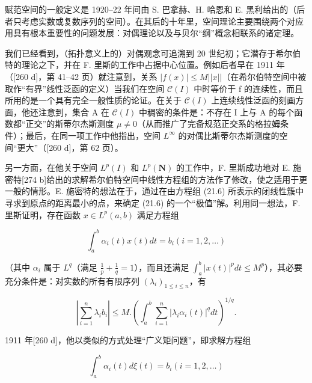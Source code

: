 赋范空间的一般定义是 1920–22 年间由 S. 巴拿赫、H. 哈恩和 E. 黑利给出的（后者只考虑实数或复数序列的空间）。在其后的十年里，空间理论主要围绕两个对应用具有根本重要性的问题发展：对偶理论以及与贝尔“纲”概念相联系的诸定理。

我们已经看到，（拓扑意义上的）对偶观念可追溯到 20 世纪初；它潜存于希尔伯特的理论之下，并在 F. 里斯的工作中占据中心位置。例如后者早在 1911 年（{[}260 d{]}，第 41–42 页）就注意到，关系 \(|f(x)| \leq M||x||\)（在希尔伯特空间中被取作“有界”线性泛函的定义）当我们在空间 \(\mathcal{C}(I)\) 中时等价于 f 的连续性，而且所用的是一个具有完全一般性质的论证。在关于 \(\mathcal{C}(I)\) 上连续线性泛函的刻画方面，他还注意到，集合 A 在 \(\mathcal{C}(I)\) 中稠密的条件是：不存在 I 上与 A 的每个函数都“正交”的斯蒂尔杰斯测度 \(\mu \neq 0\)（从而推广了完备规范正交系的格拉姆条件）；最后，在同一项工作中他指出，空间 \(L^{\infty}\) 的对偶比斯蒂尔杰斯测度的空间“更大”（{[}260 d{]}，第 62 页）。

另一方面，在他关于空间 \(L^{p}(I)\) 和 \(L^{p}(\mathbf{N})\) 的工作中，F. 里斯成功地对 E. 施密特{[}274 b{]}给出的求解希尔伯特空间中线性方程组的方法作了修改，使之适用于更一般的情形。E. 施密特的想法在于，通过在由方程组 (21.6) 所表示的闭线性簇中寻求到原点的距离最小的点，来确定 (21.6) 的一个“极值”解。利用同一想法，F. 里斯证明，存在函数 \(x \in L^{p}(a, b)\) 满足方程组

\[
\int_ {a} ^ {b} \alpha_ {i} (t) x (t) d t = b _ {i} (i = 1, 2, \dots)\tag{21.9}
\]

（其中 \(\alpha_{i}\) 属于 \(L^{q}\)（满足 \(\frac{1}{p} +\frac{1}{q} = 1\)），而且还满足 \(\int_{a}^{b}|x(t)|^{p}dt\leq M^{p}\)），其必要充分条件是：对实数的所有有限序列 \((\lambda_i)_{1\leq i\leq n}\)，有

\[
\left| \sum_ {i = 1} ^ {n} \lambda_ {i} b _ {i} \right| \leq M. \left(\int_ {a} ^ {b} \sum_ {i = 1} ^ {n} | \lambda_ {i} \alpha_ {i} (t) | ^ {q} d t\right) ^ {1 / q}.\tag{21.10}
\]

1911 年{[}260 d{]}，他以类似的方式处理“广义矩问题”，即求解方程组

\[
\int_ {a} ^ {b} \alpha_ {i} (t) d \xi (t) = b _ {i} (i = 1, 2, \dots)\tag{21.11}
\]

